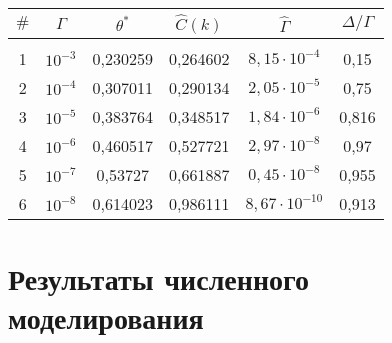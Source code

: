 \begin{multicols}{2}
\begin{table*}[b]
\begin{center}
\tabcolsep=8pt
\begin{tabular}{|c|c|c|c|c|c|}
\hline
$\#$ & $\Gamma$ & $\theta^*$ & $\hat{C}(k)$ & $\hat\Gamma $  & $\Delta/\Gamma$ \\
\hline 
&&&&&\\[-9pt]
1 & $10^{-3}$ & 0,230259 & 0,264602 & $8{,}15\cdot 10^{-4}$ & 0,15\hphantom{9}\\
2 &  $10^{-4}$ & 0,307011 &  0,290134 & $2{,}05\cdot 10^{-5}$  & 0,75\hphantom{9}\\
3 &  $10^{-5}$ & 0,383764 & 0,348517 & $1{,}84\cdot 10^{-6}$ &  0,816\\
4 &  $10^{-6}$ & 0,460517 & 0,527721 &  $2{,}97\cdot 10^{-8}$ & 0,97\hphantom{9}\\
5 &  $10^{-7}$ & 0,53727\hphantom{9} & 0,661887  &  $0{,}45\cdot 10^{-8}$ &  0,955\\
6 &  $10^{-8}$ & 0,614023 & 0,986111  &  \hphantom{$^0$}$8{,}67\cdot 10^{-10}$ & 0,913\\
\hline 
\end{tabular}
\end{center}
\end{table*}

\section{Результаты численного моделирования}


\end{multicols}
